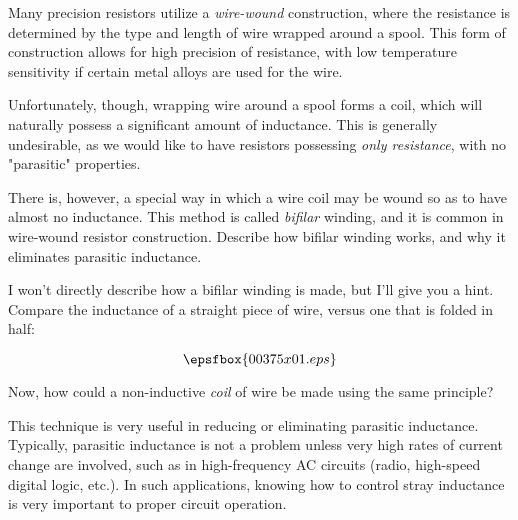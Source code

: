 

Many precision resistors utilize a {\it wire-wound} construction, where the resistance is determined by the type and length of wire wrapped around a spool.  This form of construction allows for high precision of resistance, with low temperature sensitivity if certain metal alloys are used for the wire.

Unfortunately, though, wrapping wire around a spool forms a coil, which will naturally possess a significant amount of inductance.  This is generally undesirable, as we would like to have resistors possessing {\it only resistance}, with no "parasitic" properties.

There is, however, a special way in which a wire coil may be wound so as to have almost no inductance.  This method is called {\it bifilar} winding, and it is common in wire-wound resistor construction.  Describe how bifilar winding works, and why it eliminates parasitic inductance.







I won't directly describe how a bifilar winding is made, but I'll give you a hint.  Compare the inductance of a straight piece of wire, versus one that is folded in half:

$$\epsfbox{00375x01.eps}$$

Now, how could a non-inductive {\it coil} of wire be made using the same principle?







This technique is very useful in reducing or eliminating parasitic inductance.  Typically, parasitic inductance is not a problem unless very high rates of current change are involved, such as in high-frequency AC circuits (radio, high-speed digital logic, etc.).  In such applications, knowing how to control stray inductance is very important to proper circuit operation.




